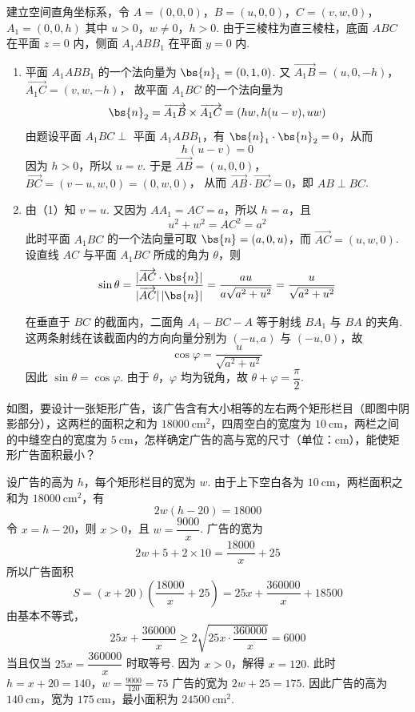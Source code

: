 \begin{solution}
建立空间直角坐标系，令
\(A=(0,0,0)\)，\(B=(u,0,0)\)，\(C=(v,w,0)\)，\(A_{1}=(0,0,h)\)
其中 \(u>0\)，\(w\ne0\)，\(h>0\). 由于三棱柱为直三棱柱，底面 \(ABC\) 在平面 \(z=0\) 内，侧面 \(A_{1}ABB_{1}\) 在平面 \(y=0\) 内.

\begin{enumerate}
\item 平面 \(A_{1}ABB_{1}\) 的一个法向量为 \(\bs{n}_{1}=(0,1,0)\). 又
\(\overrightarrow{A_{1}B}=(u,0,-h)\)，\(\overrightarrow{A_{1}C}=(v,w,-h)\)，
故平面 \(A_{1}BC\) 的一个法向量为
\[
\bs{n}_{2}=\overrightarrow{A_{1}B}\times\overrightarrow{A_{1}C}=(hw,h(u-v),uw)
\]
由题设平面 \(A_{1}BC\perp\) 平面 \(A_{1}ABB_{1}\)，有 \(\bs{n}_{1}\cdot\bs{n}_{2}=0\)，从而
\[
h(u-v)=0
\]
因为 \(h>0\)，所以 \(u=v\). 于是
\(\overrightarrow{AB}=(u,0,0)\)，\(\overrightarrow{BC}=(v-u,w,0)=(0,w,0)\)，
从而 \(\overrightarrow{AB}\cdot\overrightarrow{BC}=0\)，即 \(AB\perp BC\).

\item 由（1）知 \(v=u\). 又因为 \(AA_{1}=AC=a\)，所以 \(h=a\)，且
\[
u^2+w^2=AC^2=a^2
\]
此时平面 \(A_{1}BC\) 的一个法向量可取 \(\bs{n}=(a,0,u)\)，而 \(\overrightarrow{AC}=(u,w,0)\). 设直线 \(AC\) 与平面 \(A_{1}BC\) 所成的角为 \(\theta\)，则
\[
\sin\theta=\frac{|\overrightarrow{AC}\cdot\bs{n}|}{|\overrightarrow{AC}|\,|\bs{n}|}
=\frac{au}{a\sqrt{a^2+u^2}}=\frac{u}{\sqrt{a^2+u^2}}
\]

在垂直于 \(BC\) 的截面内，二面角 \(A_{1}-BC-A\) 等于射线 \(BA_{1}\) 与 \(BA\) 的夹角. 这两条射线在该截面内的方向向量分别为 \((-u,a)\) 与 \((-u,0)\)，故
\[
\cos\varphi=\frac{u}{\sqrt{a^2+u^2}}
\]
因此 \(\sin\theta=\cos\varphi\). 由于 \(\theta\)，\(\varphi\) 均为锐角，故 \(\theta+\varphi=\dfrac{\pi}{2}\).
\end{enumerate}
\end{solution}

\begin{problem}
如图，要设计一张矩形广告，该广告含有大小相等的左右两个矩形栏目（即图中阴影部分），这两栏的面积之和为 \(18000\mathrm{~cm}^2\)，四周空白的宽度为 \(10\mathrm{~cm}\)，两栏之间的中缝空白的宽度为 \(5\mathrm{~cm}\)，怎样确定广告的高与宽的尺寸（单位：\(\mathrm{cm}\)），能使矩形广告面积最小？

\end{problem}

\begin{solution}
设广告的高为 \(h\)，每个矩形栏目的宽为 \(w\). 由于上下空白各为 \(10\mathrm{~cm}\)，两栏面积之和为 \(18000\mathrm{~cm}^{2}\)，有
\[
2w(h-20)=18000
\]
令 \(x=h-20\)，则 \(x>0\)，且 \(w=\dfrac{9000}{x}\). 广告的宽为
\[
2w+5+2\times10=\frac{18000}{x}+25
\]
所以广告面积
\[
S=(x+20)\left(\frac{18000}{x}+25\right)=25x+\frac{360000}{x}+18500
\]
由基本不等式，
\[
25x+\frac{360000}{x}\geqslant2\sqrt{25x\cdot\frac{360000}{x}}=6000
\]
当且仅当 \(25x=\dfrac{360000}{x}\) 时取等号. 因为 \(x>0\)，解得 \(x=120\). 此时
\(h=x+20=140\)，\(w=\frac{9000}{120}=75\)
广告的宽为 \(2w+25=175\). 因此广告的高为 \(140\mathrm{~cm}\)，宽为 \(175\mathrm{~cm}\)，最小面积为 \(24500\mathrm{~cm}^{2}\).
\end{solution}

